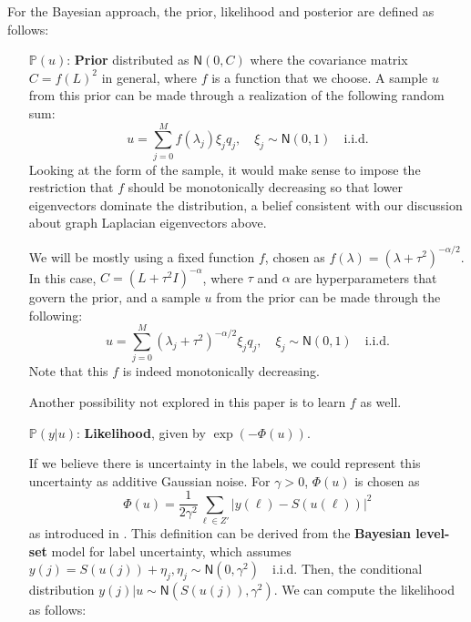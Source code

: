 \documentclass{siamart1116}
\begin{document}
    For the Bayesian approach, the prior, likelihood and posterior are defined as follows:
    \begin{itemize}
    \item[$\mathbb{P}(u)$:] {\bf Prior} distributed as $\mathsf{N}(0,C)$ where the covariance matrix $C = f(L)^2$ in general, where $f$ is a function that we choose. A sample $u$ from this prior can be made through a realization of the following random sum:
    \begin{equation}
    \label{eqn:general_prior}
    u = \sum_{j=0}^M f(\lambda_j)\xi_j q_j,\quad \xi_j\sim \mathsf{N}(0,1) \quad \text{i.i.d.}
    \end{equation}
    Looking at the form of the sample, it would make sense to impose the restriction that $f$ should be monotonically decreasing so that lower eigenvectors dominate the distribution, a belief consistent with our discussion about graph Laplacian eigenvectors above.

    We will be mostly using a fixed function $f$, chosen as $f(\lambda) = (\lambda + \tau^2)^{-\alpha/2}$. In this case, $C = (L + \tau^2I)^{-\alpha}$, where $\tau$ and $\alpha$ are hyperparameters that govern the prior, and a sample $u$ from the prior can be made through the following:
    \begin{equation}
    \label{eqn:prior}
    u = \sum_{j=0}^M (\lambda_j + \tau^2)^{-\alpha/2}\xi_j q_j,\quad \xi_j\sim \mathsf{N}(0,1) \quad \text{i.i.d.}
    \end{equation}
    Note that this $f$ is indeed monotonically decreasing.

    Another possibility not explored in this paper is to learn $f$ as well.

    \item[$\mathbb{P}(y|u)$:] {\bf Likelihood}, given by $\exp(-\Phi(u))$.

    If we believe there is uncertainty in the labels, we could represent this uncertainty as additive Gaussian noise. For $\gamma > 0$, $\Phi(u)$ is chosen as
    \begin{equation}
    \label{eqn:likelihood}
    \Phi(u) = \displaystyle \frac{1}{2\gamma^2}\sum_{\ell\in Z'}|y(\ell)-S(u(\ell))|^2
    \end{equation}
    as introduced in \cite{BLS}. This definition can be derived from the {\bf Bayesian level-set} model for label uncertainty, which assumes $y(j) = S(u(j)) + \eta_j, \eta_j \sim \mathsf{N}(0,\gamma^2) \quad \text{i.i.d.}$ Then, the conditional distribution $y(j) | u \sim \mathsf{N}(S(u(j)),\gamma^2)$. We can compute the likelihood as follows:


\end{itemize}
\end{document}
